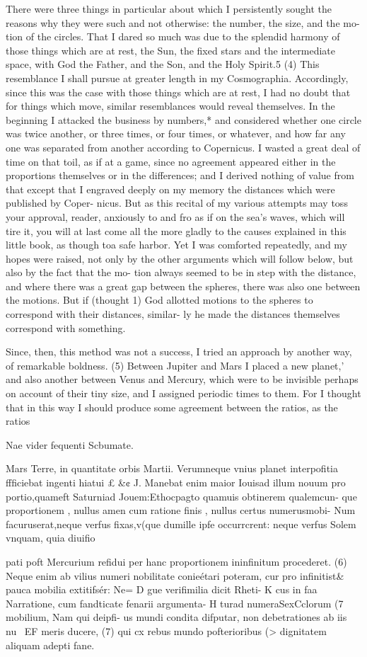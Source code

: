 \documentclass{article}
\begin{document}
{{{{{{{There were three things in particular about which I persistently sought the
reasons why they were such and not otherwise: the number, the size, and the mo-
tion of the circles. That I dared so much was due to the splendid harmony of
those things which are at rest, the Sun, the fixed stars and the intermediate space,
with God the Father, and the Son, and the Holy Spirit.5 (4) This resemblance I
shall pursue at greater length in my Cosmographia. Accordingly, since this was
the case with those things which are at rest, I had no doubt that for things which
move, similar resemblances would reveal themselves. In the beginning I attacked
the business by numbers,* and considered whether one circle was twice another,
or three times, or four times, or whatever, and how far any one was separated
from another according to Copernicus. I wasted a great deal of time on that toil,
as if at a game, since no agreement appeared either in the proportions themselves
or in the differences; and I derived nothing of value from that except that I
engraved deeply on my memory the distances which were published by Coper-
nicus. But as this recital of my various attempts may toss your approval, reader,
anxiously to and fro as if on the sea’s waves, which will tire it, you will at last
come all the more gladly to the causes explained in this little book, as though toa
safe harbor. Yet I was comforted repeatedly, and my hopes were raised, not only
by the other arguments which will follow below, but also by the fact that the mo-
tion always seemed to be in step with the distance, and where there was a great
gap between the spheres, there was also one between the motions. But if (thought
1) God allotted motions to the spheres to correspond with their distances, similar-
ly he made the distances themselves correspond with something.

Since, then, this method was not a success, I tried an approach by another way,
of remarkable boldness. (5) Between Jupiter and Mars I placed a new planet,’ and
also another between Venus and Mercury, which were to be invisible perhaps on
account of their tiny size, and I assigned periodic times to them. For I thought
that in this way I should produce some agreement between the ratios, as the ratios

Nae vider
fequenti
Scbumate.


Mars Terre, in quantitate orbis Martii. Verumneque vnius planet interpofitia
ffficiebat ingenti hiatui £ &¢ J. Manebat enim maior Iouisad illum nouum pro
portio,quameft Saturniad Jouem:Ethocpagto quamuis obtinerem qualemcun-
que proportionem , nullus amen cum ratione finis , nullus certus numerusmobi-
Num facuruserat,neque verfus fixas,v(que dumille ipfe occurrcrent: neque verfus
Solem vnquam, quia diuifio {pati poft Mercurium refidui per hanc proportionem
ininfinitum procederet. (6) Neque enim ab vilius numeri nobilitate conieétari
poteram, cur pro infinitist&
pauca mobilia extitifsér: Ne=
D gue verifimilia dicit Rheti-
K cus in faa Narratione, cum
fandticate fenarii argumenta-
H turad numeraSexCclorum
(7 mobilium, Nam qui deipfi-
us mundi condita difputar,
non debetrationes ab iis nu~
EF meris ducere, (7) qui cx
rebus mundo pofterioribus
(> dignitatem aliquam adepti
fane.

}}}}}}}}
\end{document}
